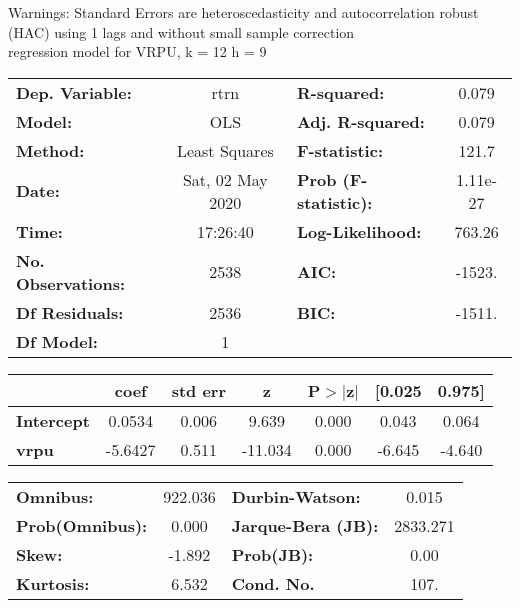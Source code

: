 Warnings: \newline
 [1] Standard Errors are heteroscedasticity and autocorrelation robust (HAC) using 1 lags and without small sample correction\\ 

regression model for VRPU, k = 12 h = 9\begin{center}
\begin{tabular}{lclc}
\toprule
\textbf{Dep. Variable:}    &       rtrn       & \textbf{  R-squared:         } &     0.079   \\
\textbf{Model:}            &       OLS        & \textbf{  Adj. R-squared:    } &     0.079   \\
\textbf{Method:}           &  Least Squares   & \textbf{  F-statistic:       } &     121.7   \\
\textbf{Date:}             & Sat, 02 May 2020 & \textbf{  Prob (F-statistic):} &  1.11e-27   \\
\textbf{Time:}             &     17:26:40     & \textbf{  Log-Likelihood:    } &    763.26   \\
\textbf{No. Observations:} &        2538      & \textbf{  AIC:               } &    -1523.   \\
\textbf{Df Residuals:}     &        2536      & \textbf{  BIC:               } &    -1511.   \\
\textbf{Df Model:}         &           1      & \textbf{                     } &             \\
\bottomrule
\end{tabular}
\begin{tabular}{lcccccc}
                   & \textbf{coef} & \textbf{std err} & \textbf{z} & \textbf{P$> |$z$|$} & \textbf{[0.025} & \textbf{0.975]}  \\
\midrule
\textbf{Intercept} &       0.0534  &        0.006     &     9.639  &         0.000        &        0.043    &        0.064     \\
\textbf{vrpu}      &      -5.6427  &        0.511     &   -11.034  &         0.000        &       -6.645    &       -4.640     \\
\bottomrule
\end{tabular}
\begin{tabular}{lclc}
\textbf{Omnibus:}       & 922.036 & \textbf{  Durbin-Watson:     } &    0.015  \\
\textbf{Prob(Omnibus):} &   0.000 & \textbf{  Jarque-Bera (JB):  } & 2833.271  \\
\textbf{Skew:}          &  -1.892 & \textbf{  Prob(JB):          } &     0.00  \\
\textbf{Kurtosis:}      &   6.532 & \textbf{  Cond. No.          } &     107.  \\
\bottomrule
\end{tabular}
\end{center}

